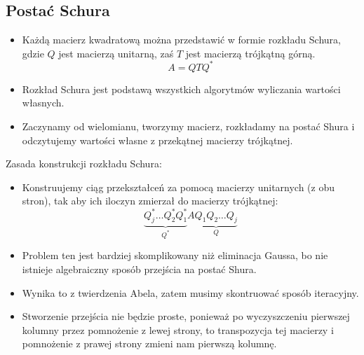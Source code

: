 \documentclass[a4paper]{article}
\begin{document}
\subsection{Postać Schura}
\begin{itemize}
    \item Każdą macierz kwadratową można przedstawić w formie rozkładu Schura, gdzie $Q$ jest macierzą unitarną, zaś $T$ jest macierzą trójkątną górną.
    \begin{equation*}
        A = QTQ^*
    \end{equation*}
    \item Rozkład Schura jest podstawą wszystkich algorytmów wyliczania wartości własnych.
    \item Zaczynamy od wielomianu, tworzymy macierz, rozkładamy na postać Shura i odczytujemy wartości własne z przekątnej macierzy trójkątnej.
\end{itemize}

Zasada konstrukcji rozkładu Schura:
\begin{itemize}
    \item Konstruujemy ciąg przekształceń za pomocą macierzy unitarnych (z obu stron), tak aby ich iloczyn zmierzał do macierzy trójkątnej:
    \begin{equation*}
        \underbrace{Q_j^* \dots Q_2^*Q_1^*}_{Q^*} A \underbrace{Q_1Q_2 \dots Q_j}_{Q}
    \end{equation*}
    \item Problem ten jest bardziej skomplikowany niż eliminacja Gaussa, bo nie istnieje algebraiczny sposób przejścia na postać Shura.
    \item Wynika to z twierdzenia Abela, zatem musimy skontruować sposób iteracyjny.
    \item Stworzenie przejścia nie będzie proste, ponieważ po wyczyszczeniu pierwszej kolumny przez pomnożenie z lewej strony, to transpozycja tej macierzy i pomnożenie z prawej strony zmieni nam pierwszą kolumnę.
\end{itemize}
\end{document}
